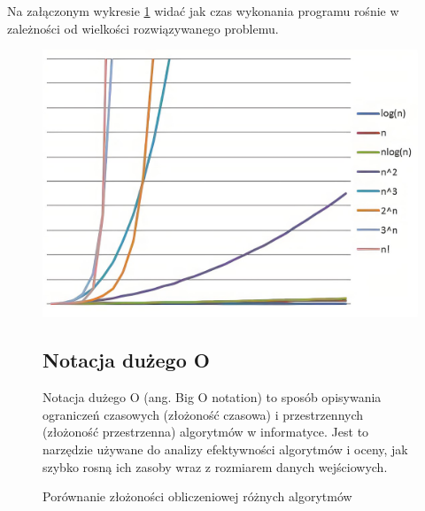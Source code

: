 Na załączonym wykresie \ref{fig:wykres} widać jak czas wykonania programu rośnie w zależności od wielkości rozwiązywanego problemu.
\begin{figure}[htbp]
    \centering
    \includegraphics[scale=0.21]{pictures/zlozonosc_obliczeniowa.jpeg}
    \caption{Porównanie złożoności obliczeniowej różnych algorytmów}
    \label{fig:wykres}

\subsection{Notacja dużego O}
Notacja dużego O (ang. Big O notation) to sposób opisywania ograniczeń czasowych (złożoność czasowa) i przestrzennych (złożoność przestrzenna) algorytmów w informatyce. Jest to narzędzie używane do analizy efektywności algorytmów i oceny, jak szybko rosną ich zasoby wraz z rozmiarem danych wejściowych.
\end{figure} 